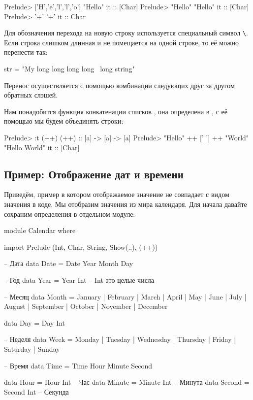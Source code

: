 \begin{code}
Prelude> ['H','e','l','l','o']
"Hello"
it :: [Char]
Prelude> "Hello"
"Hello"
it :: [Char]
Prelude> '+'
'+'
it :: Char
\end{code}

Для обозначения перехода на новую строку используется специальный символ
\In{}\verb!\!. Если строка слишком длинная и не помещается на
одной строке, то её можно перенести так:


\begin{code}
str = "My long long long long \
        \long long string"
\end{code}

Перенос осуществляется с помощью комбинации следующих друг за другом
обратных слэшей.

Нам понадобится функция конкатенации списков \In{(++)}, она определена в
\In{Prelude}, с её помощью мы будем объединять строки:


\begin{code}
Prelude> :t (++)
(++) :: [a] -> [a] -> [a]
Prelude> "Hello" ++ [' '] ++ "World"
"Hello World"
it :: [Char]
\end{code}

\subsection{Пример: Отображение дат и времени}

Приведём, пример в котором отображаемое значение не совпадает с видом
значения в коде. Мы отобразим значения из мира календаря. Для начала
давайте сохраним определения в отдельном модуле:


\begin{code}
module Calendar where

import Prelude (Int, Char, String, Show(..), (++))

-- Дата
data Date = Date Year Month Day

-- Год
data Year  = Year Int       -- Int это целые числа

-- Месяц
data Month  = January    | February   | March    | April          
            | May        | June       | July     | August   
            | September  | October    | November | December

data Day = Day Int

-- Неделя
data Week  = Monday     | Tuesday   | Wednesday 
           | Thursday   | Friday    | Saturday     
           | Sunday   

-- Время
data Time = Time Hour Minute Second

data Hour   = Hour   Int    -- Час
data Minute = Minute Int    -- Минута
data Second = Second Int    -- Секунда
\end{code}

